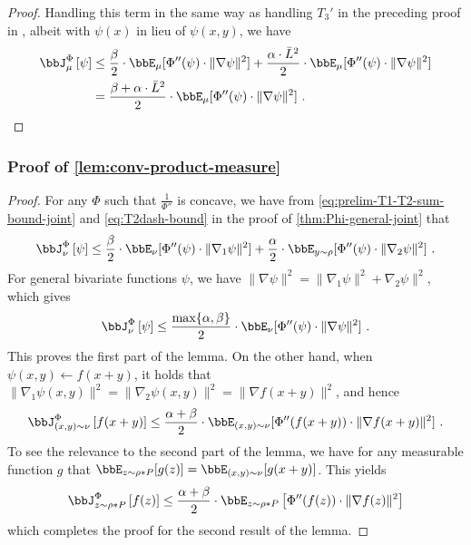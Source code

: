 \documentclass[11pt]{article}
\newcounter{ct}
\newcommand{\Phient}[3]{
    \ensuremath{\if$#3$\bbJ_{#1}^{#2}\else\bbJ_{#1}^{#2}\left[#3\right]\fi}}
\begin{document}
\begin{proof}
Handling this term in the same way as handling \(T_{3}'\) in the preceding proof in , albeit with \(\psi(x)\) in lieu of \(\psi(x, y)\), we have
\begin{align*}
    \Phient{\mu}{\Phi}{\psi} &\leq \frac{\beta}{2} \cdot \bbE_{\mu}[\Phi''(\psi) \cdot \|\nabla\psi\|^{2}] + \frac{\alpha \cdot \bar{L}^{2}}{2} \cdot \bbE_{\mu}[\Phi''(\psi) \cdot \|\nabla\psi\|^{2}] \\
    &= \frac{\beta + \alpha \cdot \bar{L}^{2}}{2} \cdot \bbE_{\mu}[\Phi''(\psi) \cdot \|\nabla\psi\|^{2}]~.
\end{align*}
\end{proof}

\subsubsection{Proof of \cref{lem:conv-product-measure}}
\label{sec:prf:conv-product-measure}

\begin{proof}

For any \(\Phi\) such that \(\frac{1}{\Phi''}\) is concave, we have from \cref{eq:prelim-T1-T2-sum-bound-joint} and \cref{eq:T2dash-bound} in the proof of \cref{thm:Phi-general-joint} that
\begin{equation*}
    \Phient{\nu}{\Phi}{\psi} \leq \frac{\beta}{2} \cdot \bbE_{\nu}[\Phi''(\psi) \cdot \|\nabla_{1}\psi\|^{2}] + \frac{\alpha}{2} \cdot \bbE_{y \sim \rho}[\Phi''(\psi) \cdot \|\nabla_{2}\psi\|^{2}]~.
\end{equation*}
For general bivariate functions \(\psi\), we have \(
\|\nabla \psi\|^{2} = \|\nabla_{1}\psi\|^{2} + \nabla_{2}\psi\|^{2}\), which gives
\begin{equation*}
    \Phient{\nu}{\Phi}{\psi} \leq \frac{\max\{\alpha, \beta\}}{2} \cdot \bbE_{\nu}[\Phi''(\psi) \cdot \|\nabla \psi\|^{2}]~.
\end{equation*}
This proves the first part of the lemma.
On the other hand, when \(\psi(x, y) \leftarrow f(x + y)\), it holds that \(\|\nabla_{1} \psi(x, y)\|^{2} = \|\nabla_{2} \psi(x, y)\|^{2} = \|\nabla f(x + y)\|^{2}\), and hence
\begin{equation*}
    \Phient{(x, y) \sim \nu}{\Phi}{f(x + y)} \leq \frac{\alpha + \beta}{2} \cdot \bbE_{(x, y) \sim \nu}[\Phi''(f(x + y)) \cdot \|\nabla f(x + y)\|^{2}]~.
\end{equation*}
To see the relevance to the second part of the lemma, we have for any measurable function \(g\) that \(\bbE_{z \sim \rho \ast P}[g(z)] = \bbE_{(x, y) \sim \nu}[g(x + y)]\).
This yields
\begin{equation*}
    \Phient{z \sim \rho \ast P}{\Phi}{f(z)} \leq \frac{\alpha + \beta}{2} \cdot \bbE_{z \sim \rho \ast P}\left[\Phi''(f(z)) \cdot \|\nabla f(z)\|^{2}\right]
\end{equation*}
which completes the proof for the second result of the lemma.
\end{proof}
\end{document}
